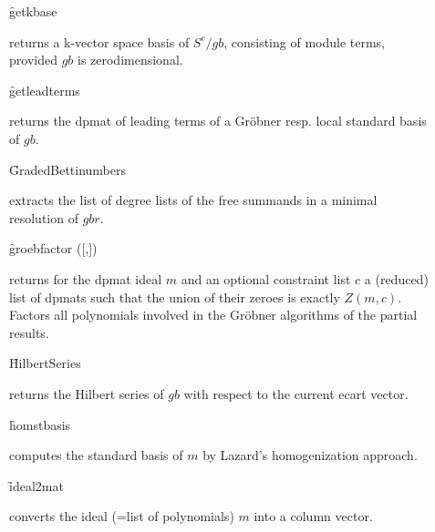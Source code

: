 \begin{description}
\item[]
  \begin{syntax}
    \f{getkbase} 
  \end{syntax}
  \hypertarget{operator:GETKBASE}{}
returns a k-vector space basis of $S^c/gb$, consisting of module
terms, provided $gb$ is zerodimensional.

\item[]
  \begin{syntax}
    \f{getleadterms} 
  \end{syntax}
  \hypertarget{operator:GETLEADTERMS}{}
returns the dpmat of leading terms of a Gr\"obner resp. local standard
basis of $gb$.

\item[]
  \begin{syntax}
    \f{GradedBettinumbers} 
  \end{syntax}
  \hypertarget{operator:GRADEDBETTINUMBERS}{}
extracts the list of degree lists of the free summands in a
minimal resolution of $gbr$.

\item[]
  \begin{syntax}
    \f{groebfactor} ([,])
  \end{syntax}
  \hypertarget{operator:GROEBFACTOR}{}
returns for the dpmat ideal $m$ and an optional constraint list
$c$ a (reduced) list of dpmats such that the union of their zeroes is
exactly $Z(m,c)$. Factors all polynomials involved in the Gr\"obner
algorithms of the partial results.

\item[]
  \begin{syntax}
    \f{HilbertSeries} 
  \end{syntax}
  \hypertarget{operator:HILBERTSERIES}{}
returns the Hilbert series of $gb$ with respect to the current
ecart vector.

\item[]
  \begin{syntax}
    \f{homstbasis} 
  \end{syntax}
  \hypertarget{operator:HOMSTBASIS}{}
computes the standard basis of $m$ by Lazard's homogenization
approach.

\item[]
  \begin{syntax}
    \f{ideal2mat} 
  \end{syntax}
  \hypertarget{operator:IDEAL2MAT}{}
converts the ideal (=list of polynomials) $m$ into a column
vector.


\end{description}
